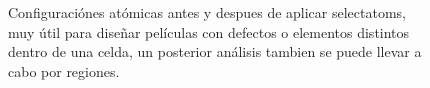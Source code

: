 \begin{figure}[h!]
\centering
{}
\caption{Configuraci\'ones at\'omicas antes y despues de aplicar selectatoms, muy \'util para dise\~nar pel\'iculas con defectos o elementos distintos dentro de una celda, un posterior an\'alisis tambien se puede llevar a cabo por regiones.}
\label{fig:selectatoms}
\end{figure}
